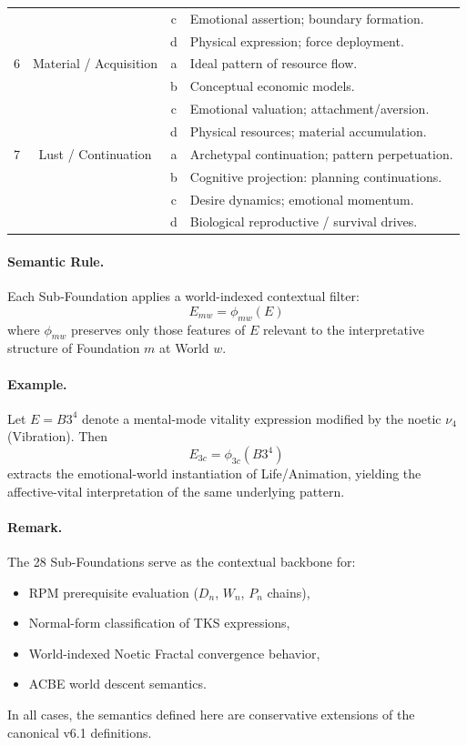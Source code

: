 \documentclass[11pt,twoside,openright]{book}
\theoremstyle{definition}
\theoremstyle{plain}
\theoremstyle{remark}
\newcommand{\noe}[1]{\nu_{#1}}
\begin{document}
\begin{table}[H]
{\begin{tabular}{c|c|c|p{6.5cm}}
  &                       & c & Emotional assertion; boundary formation. \\
  &                       & d & Physical expression; force deployment. \\
\midrule
6 & Material / Acquisition & a & Ideal pattern of resource flow. \\
  &                        & b & Conceptual economic models. \\
  &                        & c & Emotional valuation; attachment/aversion. \\
  &                        & d & Physical resources; material accumulation. \\
\midrule
7 & Lust / Continuation   & a & Archetypal continuation; pattern perpetuation. \\
  &                       & b & Cognitive projection: planning continuations. \\
  &                       & c & Desire dynamics; emotional momentum. \\
  &                       & d & Biological reproductive / survival drives. \\
\bottomrule
\end{tabular}%
}
\end{table}

\paragraph{Semantic Rule.}
Each Sub-Foundation applies a world-indexed contextual filter:
\[
E_{mw} = \phi_{mw}(E)
\]
where $\phi_{mw}$ preserves only those features of $E$ relevant to the
interpretative structure of Foundation $m$ at World $w$.

\paragraph{Example.}
Let $E = B3^{4}$ denote a mental-mode vitality expression modified by the
noetic $\noe{4}$ (Vibration). Then
\[
E_{3c} = \phi_{3c}(B3^{4})
\]
extracts the emotional-world instantiation of Life/Animation, yielding the
affective-vital interpretation of the same underlying pattern.

\paragraph{Remark.}
The 28 Sub-Foundations serve as the contextual backbone for:
\begin{itemize}
  \item RPM prerequisite evaluation ($D_n$, $W_n$, $P_n$ chains),
  \item Normal-form classification of TKS expressions,
  \item World-indexed Noetic Fractal convergence behavior,
  \item ACBE world descent semantics.
\end{itemize}
In all cases, the semantics defined here are conservative extensions of the
canonical v6.1 definitions.
\end{document}
